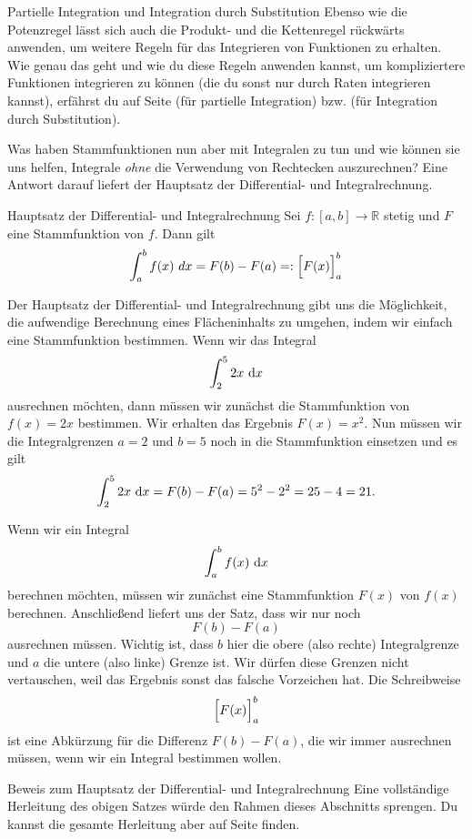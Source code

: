 \documentclass[../../main.tex]{subfiles}
\begin{document}
\begin{advanced}{Partielle Integration und Integration durch Substitution}
    Ebenso wie die Potenzregel lässt sich auch die Produkt- und die Kettenregel rückwärts anwenden, um weitere Regeln für das Integrieren
    von Funktionen zu erhalten. Wie genau das geht und wie du diese Regeln anwenden kannst, um kompliziertere Funktionen 
    integrieren zu können (die du sonst nur durch Raten integrieren kannst), erfährst du auf Seite 
    \pageref{partielle-integration} (für partielle Integration) bzw. 
    \pageref{substitution} (für Integration durch Substitution).
\end{advanced}
Was haben Stammfunktionen nun aber mit Integralen zu tun und wie können sie uns helfen, Integrale \emph{ohne}
die Verwendung von Rechtecken auszurechnen? Eine Antwort darauf liefert der Hauptsatz der Differential- und 
Integralrechnung. 
\begin{theorem}{Hauptsatz der Differential- und Integralrechnung}
    Sei $f:[a,b]\rightarrow\mathbb{R}$ stetig und $F$ eine Stammfunktion von $f$. Dann gilt
    \[\int_a^b f(x)~dx=F(b)-F(a)=:\Bigl[F(x)\Bigr]_a^b\]
\end{theorem}
\begin{example}{}
    Der Hauptsatz der Differential- und Integralrechnung gibt uns die Möglichkeit, die aufwendige Berechnung eines
    Flächeninhalts zu umgehen, indem wir einfach eine Stammfunktion bestimmen. Wenn wir das Integral
    \[\int_2^52x\mathop{}\mathrm{d} x\]
    ausrechnen möchten, dann müssen wir zunächst die Stammfunktion von $f(x)=2x$ bestimmen. Wir erhalten das Ergebnis
    $F(x)=x^2$. Nun müssen wir die Integralgrenzen $a=2$ und $b=5$ noch in die Stammfunktion einsetzen und es gilt
    \[\int_2^52x\mathop{}\mathrm{d} x=F(b)-F(a)=5^2-2^2=25-4=21.\]
\end{example}
Wenn wir ein Integral
\[\int_a^bf(x)\mathop{}\mathrm{d} x\]
berechnen möchten, müssen wir zunächst eine Stammfunktion $F(x)$ von $f(x)$ berechnen. Anschließend liefert uns der Satz, dass
wir nur noch
\[F(b)-F(a)\]
ausrechnen müssen. Wichtig ist, dass $b$ hier die obere (also rechte) Integralgrenze und $a$ die untere (also linke) 
Grenze ist. Wir dürfen diese Grenzen nicht vertauschen, weil das Ergebnis sonst das falsche Vorzeichen hat.
Die Schreibweise
\[\Bigl[F(x)\Bigr]_a^b\]
ist eine Abkürzung für die Differenz $F(b)-F(a)$, die wir immer ausrechnen müssen, wenn wir ein Integral bestimmen wollen.
\begin{advanced}{Beweis zum Hauptsatz der Differential- und Integralrechnung}
    Eine vollständige Herleitung des obigen Satzes würde den Rahmen dieses Abschnitts sprengen. Du kannst die
    gesamte Herleitung aber auf Seite \pageref{hdi-beweis} finden.
\end{advanced}
\end{document}
